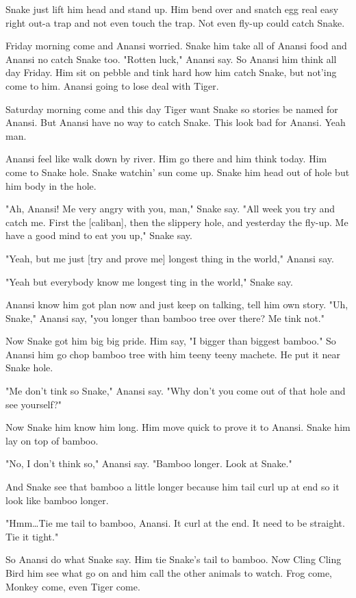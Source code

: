 Snake just lift him head and stand up. Him bend over and snatch egg real easy right out-a trap and not even touch the trap. Not even fly-up could catch Snake.

Friday morning come and Anansi worried. Snake him take all of Anansi food and Anansi no catch Snake too. "Rotten luck," Anansi say. So Anansi him think all day Friday. Him sit on pebble and tink hard how him catch Snake, but not'ing come to him. Anansi going to lose deal with Tiger.

Saturday morning come and this day Tiger want Snake so stories be named for Anansi. But Anansi have no way to catch Snake. This look bad for Anansi. Yeah man.

Anansi feel like walk down by river. Him go there and him think today. Him come to Snake hole. Snake watchin' sun come up. Snake him head out of hole but him body in the hole.

"Ah, Anansi! Me very angry with you, man," Snake say. "All week you try and catch me. First the [caliban], then the slippery hole, and yesterday the fly-up. Me have a good mind to eat you up," Snake say.

"Yeah, but me just [try and prove me] longest thing in the world," Anansi say.

"Yeah but everybody know me longest ting in the world," Snake say.

Anansi know him got plan now and just keep on talking, tell him own story. "Uh, Snake," Anansi say, "you longer than bamboo tree over there? Me tink not."

Now Snake got him big big pride. Him say, "I bigger than biggest bamboo." So Anansi him go chop bamboo tree with him teeny teeny machete. He put it near Snake hole.

"Me don't tink so Snake," Anansi say. "Why don't you come out of that hole and see yourself?"

Now Snake him know him long. Him move quick to prove it to Anansi. Snake him lay on top of bamboo.

"No, I don't think so," Anansi say. "Bamboo longer. Look at Snake."

And Snake see that bamboo a little longer because him tail curl up at end so it look like bamboo longer.

"Hmm\dots Tie me tail to bamboo, Anansi. It curl at the end. It need to be straight. Tie it tight."

So Anansi do what Snake say. Him tie Snake's tail to bamboo. Now Cling Cling Bird him see what go on and him call the other animals to watch. Frog come, Monkey come, even Tiger come.

